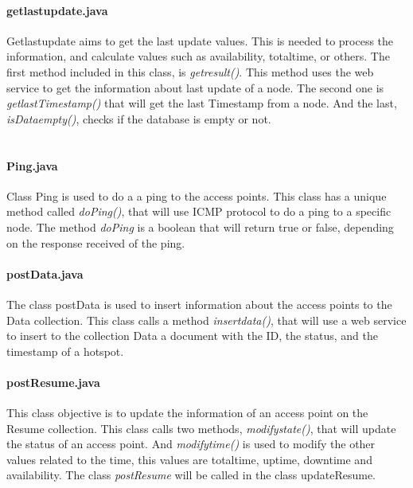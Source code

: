 \documentclass[12pt, a4paper,twoside]{tesi_upf}
\begin{document}
                \paragraph{getlastupdate.java}
                
                Getlastupdate aims to get the last update values. This is needed to process the information, and calculate values such as availability, totaltime, or others. The first method included in this class, is \textit{getresult()}. This method uses the web service to get the information about last update of a node. The second one is \textit{getlastTimestamp()} that will get the last Timestamp from a node. And the last, \textit{isDataempty()}, checks if the database is empty or not.\\
                \\

                \paragraph{Ping.java}
                
                Class Ping is used to do a a ping to the access points. This class has a unique method called \textit{doPing()}, that will use ICMP protocol to do a ping to a specific node. The method \textit{doPing} is a boolean that will return true or false, depending on the response received of the ping.\\
                
                \paragraph{postData.java}
                
                The class postData is used to insert information about the access points to the Data collection. This class calls a method \textit{insertdata()}, that will use a web service to insert to the collection Data a document with the ID, the status, and the timestamp of a hotspot. \\
                
                \paragraph{postResume.java}
                This class objective is to update the information of an access point on the Resume collection. This class calls two methods, \textit{modifystate()}, that will update the status of an access point. And \textit{modifytime()} is used to modify the other values related to the time, this values are totaltime, uptime, downtime and availability. The class \emph{postResume} will be called in the class updateResume.\\
                
\end{document}
